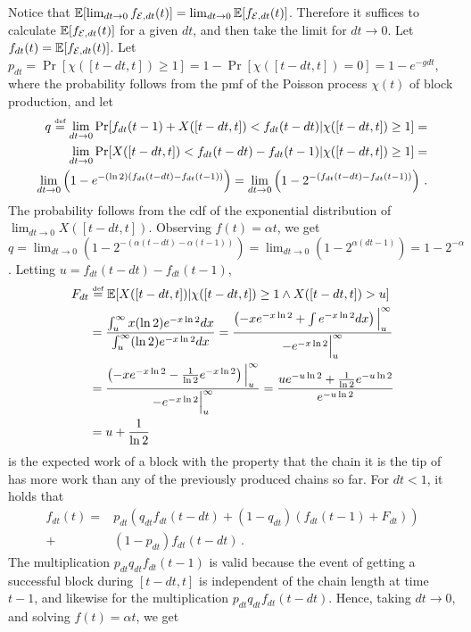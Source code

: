 Notice that $\mathop{{}\mathbb{E}}[\lim_{dt \to 0} f_{\mathcal{E},dt}(t)] = \lim_{dt \to 0} \mathop{{}\mathbb{E}}[f_{\mathcal{E},dt}(t)]$.
Therefore it suffices to calculate $\mathop{{}\mathbb{E}}[f_{\mathcal{E},dt}(t)]$ for a given $dt$,
and then take the limit for $dt \to 0$.
Let $f_{dt}(t) = \mathop{{}\mathbb{E}}[f_{\mathcal{E},dt}(t)]$.
Let $p_{dt} = \Pr[\chi([t - dt, t]) \geq 1] = 1 - \Pr[\chi([t - dt, t]) = 0] = 1 - e^{-g dt}$, where
the probability follows from the pmf of the Poisson process $\chi(t)$
of block production,
and let
\begin{align*}
  q \stackrel{\text{\tiny def}}{=} \lim_{dt \to 0} \Pr[f_{dt}(t - 1) + X([t - dt, t]) < f_{dt}(t - dt)|\chi([t - dt, t]) \geq 1] =\\
           \lim_{dt \to 0} \Pr[X([t - dt, t]) < f_{dt}(t - dt) - f_{dt}(t - 1)|\chi([t - dt, t]) \geq 1] = \\
           \lim_{dt \to 0} \left( 1 - e^{-(\ln2) (f_{dt}(t - dt) - f_{dt}(t - 1))}\right) =
           \lim_{dt \to 0} \left(1 - 2^{-(f_{dt}(t - dt) - f_{dt}(t - 1))}\right)
  \,.
\end{align*}
The probability follows from the cdf of the exponential distribution of $\lim_{dt \to 0} X([t - dt, t])$.
Observing $f(t) = \alpha t$, we get $q = \lim_{dt \to 0}\left(1 - 2^{-(\alpha(t - dt) - \alpha(t - 1))}\right)
= \lim_{dt \to 0}\left(1 - 2^{\alpha (dt - 1)}\right) = 1 - 2^{-\alpha}$.
Letting $u = f_{dt}(t - dt) - f_{dt}(t - 1)$,
\begin{align*}
  F_{dt} &\stackrel{\text{\tiny def}}{=} \mathop{{}\mathbb{E}}[X([t - dt, t])|\chi([t - dt, t]) \geq 1 \land X([t - dt, t]) > u]\\
         &= \frac{\int_u^\infty x (\ln2) e^{-x \ln2} dx}{\int_u^\infty (\ln2) e^{-x \ln2} dx}
          = \frac{\left(-x e^{-x \ln2} + \int{e^{-x \ln2} dx}\right)\Big|_u^\infty}{-e^{-x \ln2}\Big|_u^\infty}\\
         &= \frac{\left(-x e^{-x \ln2} - \frac{1}{\ln2} e^{-x \ln2}\right)\Big|_u^\infty}{-e^{-x \ln2}\Big|_u^\infty}
          = \frac{u e^{-u\ln2} + \frac{1}{\ln2} e^{-u \ln2}}{e^{-u \ln2}}\\
         &= u + \frac{1}{\ln2}\,
\end{align*}
is the expected work of a block with the property that the chain it is the tip of has more work than any of the
previously produced chains so far.
For $dt < 1$, it holds that
\begin{align*}
  f_{dt}(t) =
      &p_{dt}\left(q_{dt}f_{dt}(t - dt) + (1 - q_{dt})(f_{dt}(t - 1) + F_{dt})\right)\\
    + &(1 - p_{dt})f_{dt}(t - dt)\,.
\end{align*}
The multiplication $p_{dt} q_{dt} f_{dt} (t - 1)$ is valid because the event of getting a successful block
during $[t - dt, t]$ is independent of the chain length at time $t - 1$, and likewise for the multiplication
$p_{dt} q_{dt} f_{dt}(t - dt)$.
Hence, taking $dt \to 0$, and solving $f(t) = \alpha t$, we get
\begin{align*}
\end{align*}

